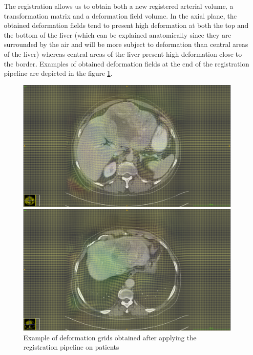 The registration allows us to obtain both a new registered arterial volume, a transformation matrix and a deformation field volume. In the axial plane, the obtained deformation fields tend to present high deformation at both the top and the bottom of the liver (which can be explained anatomically since they are surrounded by the air and will be more subject to deformation than central areas of the liver) whereas central areas of the liver present high deformation close to the border. Examples of obtained deformation fields at the end of the registration pipeline are depicted in the figure \ref{fig:deformationGridExamples}.

\begin{figure}
\centering
\begin{minipage}{0.7\linewidth}
\includegraphics[width=\linewidth]{../HistologicalGradePrediction/images/TCIA_TCGA-DD-A11A_deformation_grid_slice49}
\end{minipage}

\vspace{0.8cm}
\begin{minipage}{0.7\linewidth}
\includegraphics[width=\linewidth]{../HistologicalGradePrediction/images/TCIA_TCGA-DD-A11A_deformation_grid_slice68}
\end{minipage}
\caption{Example of deformation grids obtained after applying the registration pipeline on  patients}
\label{fig:deformationGridExamples}
\end{figure}
